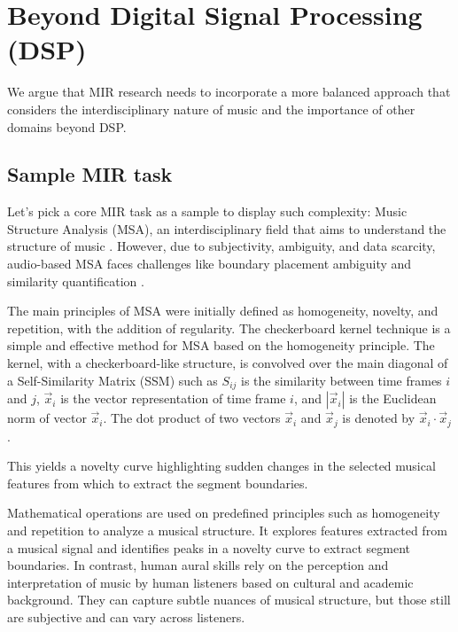 \section{Beyond Digital Signal Processing (DSP)}

We argue that MIR research needs to incorporate a more balanced approach that considers the interdisciplinary nature of music and the importance of other domains beyond DSP.

\subsection{Sample MIR task}

Let's pick a core MIR task as a sample to display such complexity: Music Structure Analysis (MSA), an interdisciplinary field that aims to understand the structure of music \cite{Nieto2020Audio-BasedApplications}. However, due to subjectivity, ambiguity, and data scarcity, audio-based MSA faces challenges like boundary placement ambiguity and similarity quantification \cite{NietoPerceptualMusic}. 

The main principles of MSA were initially defined as homogeneity, novelty, and repetition, with the addition of regularity. The checkerboard kernel technique is a simple and effective method for MSA based on the homogeneity principle. The kernel, with a checkerboard-like structure, is convolved over the main diagonal of a Self-Similarity Matrix (SSM) such as $S_{ij}$ is the similarity between time frames $i$ and $j$, $\vec{x}_i$ is the vector representation of time frame $i$, and $\left| \vec{x}_i \right|$ is the Euclidean norm of vector $\vec{x}_i$. The dot product of two vectors $\vec{x}_i$ and $\vec{x}_j$ is denoted by $\vec{x}_i \cdot \vec{x}_j$.



This yields a novelty curve highlighting sudden changes in the selected musical features from which to extract the segment boundaries.



Mathematical operations are used on predefined principles such as homogeneity and repetition to analyze a musical structure. It explores features extracted from a musical signal and identifies peaks in a novelty curve to extract segment boundaries. In contrast, human aural skills rely on the perception and interpretation of music by human listeners based on cultural and academic background. They can capture subtle nuances of musical structure, but those still are subjective and can vary across listeners.


